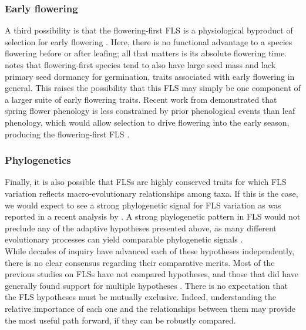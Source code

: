 \documentclass[11pt]{article}
\begin{document}
\subsubsection*{Early flowering}
\noindent A third possibility is that the flowering-first FLS is a physiological byproduct of selection for early flowering \citep{Primack1987}. Here, there is no functional advantage to a species flowering before or after leafing; all that matters is its absolute flowering time. \citet{Primack1987} notes that flowering-first species tend to also have large seed mass and lack primary seed dormancy for germination, traits associated with early flowering in general. This raises the possibility that this FLS may simply be one component of a larger suite of early flowering traits. Recent work from \citet{Savage2019} demonstrated that spring flower phenology is less constrained by prior phenological events than leaf phenology, which would allow selection to drive flowering into the early season, producing the flowering-first FLS . %

\subsubsection*{Phylogenetics} %
\noindent Finally, it is also possible that FLSs are highly conserved traits for which FLS variation reflects macro-evolutionary relationships among taxa. If this is the case, we would expect to see a strong phylogenetic signal for FLS variation as was reported in a recent analysis by \citet{Gougherty2018}. A strong phylogenetic pattern in FLS would not preclude any of the adaptive hypotheses presented above, as  many different evolutionary processes can yield comparable phylogenetic signals \citep{Revell2008}. \\

\noindent While decades of inquiry have advanced each of these hypotheses independently, there is no clear consensus regarding their comparative merits. Most of the previous studies on FLSs have not compared hypotheses, and those that did have generally found support for multiple hypotheses \citep[see][]{Bolmgren2003,Gougherty2018}. There is no expectation that the FLS hypotheses must be mutually exclusive. Indeed, understanding the relative importance of each one and the relationships between them may provide the most useful path forward, if they can be robustly compared.\\
\end{document}
